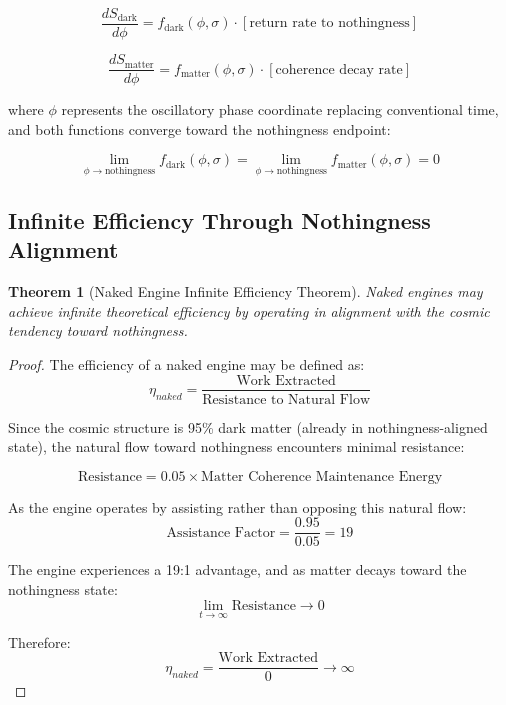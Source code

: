 \documentclass[11pt,a4paper]{article}
\newtheorem{theorem}{Theorem}[section]
\theoremstyle{remark}
\begin{document}
\begin{equation}
\frac{dS_{\text{dark}}}{d\phi} = f_{\text{dark}}(\phi, \sigma) \cdot [\text{return rate to nothingness}]
\label{eq:dark_entropy}
\end{equation}

\begin{equation}
\frac{dS_{\text{matter}}}{d\phi} = f_{\text{matter}}(\phi, \sigma) \cdot [\text{coherence decay rate}]
\label{eq:matter_entropy}
\end{equation}

where $\phi$ represents the oscillatory phase coordinate replacing conventional time, and both functions converge toward the nothingness endpoint:

\begin{equation}
\lim_{\phi \to \text{nothingness}} f_{\text{dark}}(\phi, \sigma) = \lim_{\phi \to \text{nothingness}} f_{\text{matter}}(\phi, \sigma) = 0
\end{equation}

\subsection{Infinite Efficiency Through Nothingness Alignment}

\begin{theorem}[Naked Engine Infinite Efficiency Theorem]
Naked engines may achieve infinite theoretical efficiency by operating in alignment with the cosmic tendency toward nothingness.
\end{theorem}

\begin{proof}
The efficiency of a naked engine may be defined as:
\begin{equation}
\eta_{naked} = \frac{\text{Work Extracted}}{\text{Resistance to Natural Flow}}
\end{equation}

Since the cosmic structure is 95\% dark matter (already in nothingness-aligned state), the natural flow toward nothingness encounters minimal resistance:

\begin{equation}
\text{Resistance} = 0.05 \times \text{Matter Coherence Maintenance Energy}
\end{equation}

As the engine operates by assisting rather than opposing this natural flow:
\begin{equation}
\text{Assistance Factor} = \frac{0.95}{0.05} = 19
\end{equation}

The engine experiences a 19:1 advantage, and as matter decays toward the nothingness state:
\begin{equation}
\lim_{t \to \infty} \text{Resistance} \to 0
\end{equation}

Therefore:
\begin{equation}
\eta_{naked} = \frac{\text{Work Extracted}}{0} \to \infty
\end{equation}
\end{proof}
\end{document}
